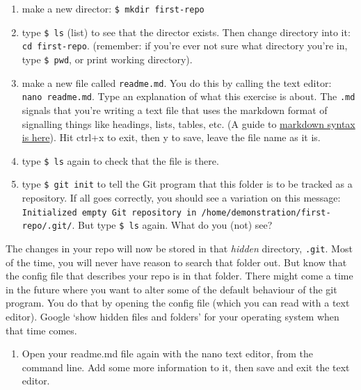 \documentclass[english,]{book}
\providecommand{\tightlist}{%
  \setlength{\itemsep}{0pt}\setlength{\parskip}{0pt}}
\begin{document}
\begin{enumerate}
\def\labelenumi{\alph{enumi}.}
\tightlist
\item
  make a new director: \texttt{\$\ mkdir\ first-repo}
\item
  type \texttt{\$\ ls} (list) to see that the director exists. Then
  change directory into it: \texttt{cd\ first-repo}. (remember: if
  you're ever not sure what directory you're in, type \texttt{\$\ pwd},
  or print working directory).
\item
  make a new file called \texttt{readme.md}. You do this by calling the
  text editor: \texttt{nano\ readme.md}. Type an explanation of what
  this exercise is about. The \texttt{.md} signals that you're writing a
  text file that uses the markdown format of signalling things like
  headings, lists, tables, etc. (A guide to
  \href{https://daringfireball.net/projects/markdown/basics.php}{markdown
  syntax is here}). Hit ctrl+x to exit, then y to save, leave the file
  name as it is.
\item
  type \texttt{\$\ ls} again to check that the file is there.
\item
  type \texttt{\$\ git\ init} to tell the Git program that this folder
  is to be tracked as a repository. If all goes correctly, you should
  see a variation on this message:
  \texttt{Initialized\ empty\ Git\ repository\ in\ /home/demonstration/first-repo/.git/}.
  But type \texttt{\$\ ls} again. What do you (not) see?
\end{enumerate}

The changes in your repo will now be stored in that \emph{hidden}
directory, \texttt{.git}. Most of the time, you will never have reason
to search that folder out. But know that the config file that describes
your repo is in that folder. There might come a time in the future where
you want to alter some of the default behaviour of the git program. You
do that by opening the config file (which you can read with a text
editor). Google `show hidden files and folders' for your operating
system when that time comes.

\begin{enumerate}
\def\labelenumi{\arabic{enumi}.}
\setcounter{enumi}{1}
\tightlist
\item
  Open your readme.md file again with the nano text editor, from the
  command line. Add some more information to it, then save and exit the
  text editor.
\end{enumerate}
\end{document}
